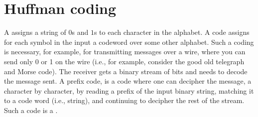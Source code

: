 %

\providecommand{\markX}[2]{%
  \begingroup\color{purple}%
  \ifmmode\underbrace{#2}_{\text{\normalfont\scriptsize[#1]}}%
  \else #2\textsuperscript{\normalfont\scriptsize[#1]}\fi\endgroup}
\providecommand{\noteX}[2]{%
  \par\smallskip\noindent{\color{purple}\textbf{[#1]} #2}\par\smallskip}

%




\ChapterPrefix{}
\ChapterGen{}





\section{Huffman coding}

A  assigns a string of $0$s and $1$s to each
character in the alphabet. A code assigns for each symbol in the input
a codeword over some other alphabet. Such a coding is necessary, for
example, for transmitting messages over a wire, where you can send only
0 or 1 on the wire (i.e., for example, consider the good old telegraph
and Morse code). The receiver gets a binary stream of bits and needs
to decode the message sent. A prefix code, is a code where one can
decipher the message, a character by character, by reading a prefix of
the input binary string, matching it to a code word (i.e., string),
and continuing to decipher the rest of the stream. Such a code is a
.

